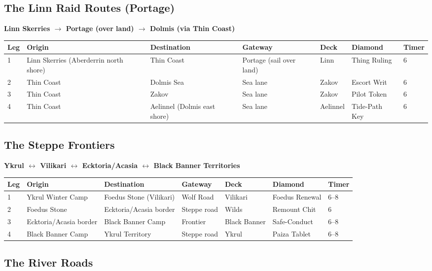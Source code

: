 \documentclass[11pt,letterpaper,twoside]{book}
\begin{document}
\subsection{The Linn Raid Routes (Portage)}

\textbf{Linn Skerries $\rightarrow$ Portage (over land) $\rightarrow$ Dolmis (via Thin Coast)}

\begin{longtable}{|p{1.5cm}|p{2.5cm}|p{2.5cm}|p{1.5cm}|p{2cm}|p{1.5cm}|}
\hline
\textbf{Leg} & \textbf{Origin} & \textbf{Destination} & \textbf{Gateway} & \textbf{Deck} & \textbf{Diamond} & \textbf{Timer} \\
 & Linn Skerries (Aberderrin north shore) & Thin Coast & Portage (sail over land) & Linn & Thing Ruling & 6 \\
2 & Thin Coast & Dolmis Sea & Sea lane & Zakov & Escort Writ & 6 \\
3 & Thin Coast & Zakov & Sea lane & Zakov & Pilot Token & 6 \\
4 & Thin Coast & Aelinnel (Dolmis east shore) & Sea lane & Aelinnel & Tide-Path Key & 6 \\
\hline
\end{longtable}

\subsection{The Steppe Frontiers}

\textbf{Ykrul $\leftrightarrow$ Vilikari $\leftrightarrow$ Ecktoria/Acasia $\leftrightarrow$ Black Banner Territories}

\begin{longtable}{|p{1.5cm}|p{2.5cm}|p{2.5cm}|p{1.5cm}|p{2cm}|p{1.5cm}|}
\hline
\textbf{Leg} & \textbf{Origin} & \textbf{Destination} & \textbf{Gateway} & \textbf{Deck} & \textbf{Diamond} & \textbf{Timer} \\
 & Ykrul Winter Camp & Foedus Stone (Vilikari) & Wolf Road & Vilikari & Foedus Renewal & 6--8 \\
2 & Foedus Stone & Ecktoria/Acasia border & Steppe road & Wilds & Remount Chit & 6 \\
3 & Ecktoria/Acasia border & Black Banner Camp & Frontier & Black Banner & Safe-Conduct & 6--8 \\
4 & Black Banner Camp & Ykrul Territory & Steppe road & Ykrul & Paiza Tablet & 6--8 \\
\hline
\end{longtable}

\subsection{The River Roads}
\end{document}
